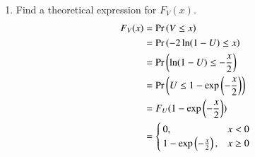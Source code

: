 \documentclass[journal,12pt,twocolumn]{IEEEtran}
\renewcommand\thesection{\arabic{section}}
\begin{document}
\begin{enumerate}[label=\thesection.\arabic*
        ,ref=\thesection.\theenumi]
    \item Find a theoretical expression for $F_V(x)$.\\
          \solution
          \begin{align}
              F_V(x) & = \Pr\left(V \le x\right)                         \\
                     & = \Pr\left(-2\ln(1-U) \le x\right)                \\
                     & = \Pr\left(\ln(1-U) \le -\frac{x}{2}\right)       \\
                     & = \Pr\left(U \le 1-\exp\left(-\frac{x}{2}\right)\right) \\
                     & = F_U(1-\exp\left(-\frac{x}{2}\right))       \\
                     & = \begin{cases}
                  0,                         & x<0     \\
                  1-\exp\left(-\frac{x}{2}\right), & x \ge 0
              \end{cases}
          \end{align}

\end{enumerate}
\end{document}
